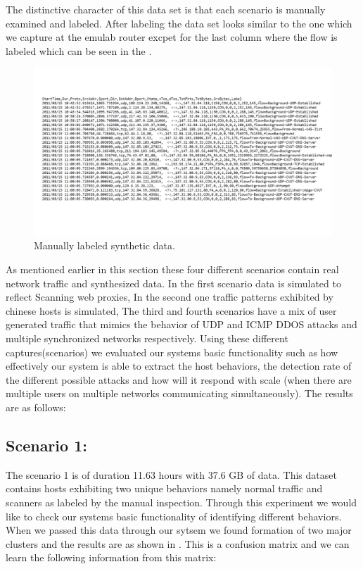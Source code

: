 The distinctive character of this data set is that each scenario is manually examined and labeled. After labeling the data set looks similar to the one which we capture at the emulab router excpet for the last column where the flow is labeled which can be seen in the .

\begin{figure}[b]
	\centerline{\includegraphics[trim=4cm 3cm 3cm 3cm, scale = 0.5]{ss_labeled.pdf}}
	\caption{Manually labeled synthetic data.}%
\end{figure}

As mentioned earlier in this section these four different scenarios contain real network traffic and synthesized data. In the first scenario data is simulated to reflect Scanning web proxies, In the second one traffic patterns exhibited by chinese hosts is simulated, The third and fourth scenarios have a mix of user generated traffic that mimics the behavior of UDP and ICMP DDOS attacks and multiple synchronized networks respectively. Using these different captures(scenarios) we evaluated our systems basic functionality such as how effectively our system is able to extract the host behaviors, the detection rate of the different possible attacks and how will it respond with scale (when there are multiple users on multiple networks communicating simultaneously). The results are as follows:

\subsection{Scenario 1:}
The scenario 1 is of duration 11.63 hours with 37.6 GB of data. This dataset contains hosts exhibiting two unique behaviors namely normal traffic and scanners as labeled by the manual inspection. Through this experiment we would like to check our systems basic functionality of identifying different behaviors. When we passed this data through our sytsem we found formation of two major clusters and the results are as shown in  . This is a confusion matrix and we can learn the following information from this matrix:

